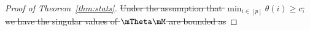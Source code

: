 \documentclass[lettersize,onecolumn,journal]{IEEEtran}
\theoremstyle{definition}
\newtheorem{lem}{Lemma}
\theoremstyle{definition}
\newcommand{\ang}[1]{\left\langle#1\right\rangle}
\def\fixme#1#2{\textbf{\color{red}[FIXME (#1): #2]}}
\providecommand{\DIFdeltex}[1]{{\protect\color{red}\sout{#1}}}                      %
\providecommand{\DIFdel}[1]{\texorpdfstring{\DIFdeltex{#1}}{}} %
\begin{document}
\begin{proof}[Proof of Theorem~\ref{thm:stats}]


\DIFdel{Under the assumption that $\min_{i \in [p]} \theta(i) \geq c$, we have the singular values of $\mTheta \mM$ are bounded as 
}%


\end{proof}
\end{document}
